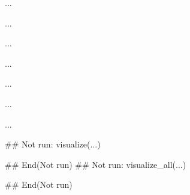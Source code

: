 \documentclass[letterpaper]{book}
\begin{document}
%
\begin{Arguments}
\begin{ldescription}
\item[\code{x}] ...

\item[\code{item}] ...

\item[\code{fun\_modify}] ...

\item[\code{annotate}] ...

\item[\code{newpage}] ...

\item[\code{legend\_hierarchy}] ...
\end{ldescription}
\end{Arguments}
%
\begin{Details}\relax
...
\end{Details}
%
\begin{Examples}
\begin{ExampleCode}
## Not run: 
visualize(...)

## End(Not run)
## Not run: 
visualize_all(...)

## End(Not run)
\end{ExampleCode}
\end{Examples}
\end{document}
